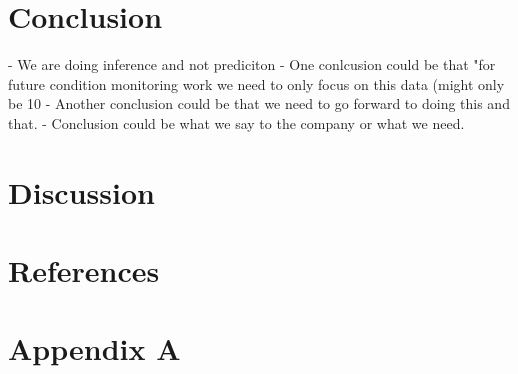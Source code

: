 \documentclass{article}
\begin{document}
\newpage  
\section{Conclusion}
- We are doing inference and not prediciton
- One conlcusion could be that "for future condition monitoring work we need to only focus on this data (might only be 10%
- Another conclusion could be that we need to go forward to doing this and that.
- Conclusion could be what we say to the company or what we need.
\newpage 
\section{Discussion} 

\newpage  
\section{References} 

 

\newpage  
\section{Appendix A}
\end{document}
